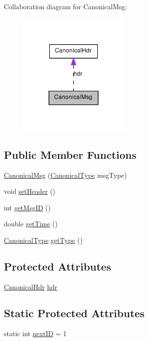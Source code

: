 Collaboration diagram for CanonicalMsg:\nopagebreak
\begin{figure}[H]
\begin{center}
\leavevmode
\includegraphics[width=156pt]{class_canonical_msg__coll__graph}
\end{center}
\end{figure}
\subsection*{Public Member Functions}
\begin{DoxyCompactItemize}
\item 
\hyperlink{class_canonical_msg_af352cb8576a7da3b756bf736c5e783da}{CanonicalMsg} (\hyperlink{canonical_msg_8hh_a82f10f8fe974cf1c4a8c7459b963ffeb}{CanonicalType} msgType)
\item 
void \hyperlink{class_canonical_msg_abfade49de8c1337f3f3690aa209f705b}{setHeader} ()
\item 
int \hyperlink{class_canonical_msg_a56011cb08f9e95be9423be7284876f74}{getMsgID} ()
\item 
double \hyperlink{class_canonical_msg_ace23472b599f3cd890b6080b5e0363e5}{getTime} ()
\item 
\hyperlink{canonical_msg_8hh_a82f10f8fe974cf1c4a8c7459b963ffeb}{CanonicalType} \hyperlink{class_canonical_msg_a4b13a61095d109722c40aaf0a66b30c2}{getType} ()
\end{DoxyCompactItemize}
\subsection*{Protected Attributes}
\begin{DoxyCompactItemize}
\item 
\hyperlink{struct_canonical_hdr}{CanonicalHdr} \hyperlink{class_canonical_msg_afce1fd35cf068067b013162e2b624b64}{hdr}
\end{DoxyCompactItemize}
\subsection*{Static Protected Attributes}
\begin{DoxyCompactItemize}
\item 
static int \hyperlink{class_canonical_msg_a2fc5e5c814ce88032683695e88b5f8f1}{nextID} = 1
\end{DoxyCompactItemize}


